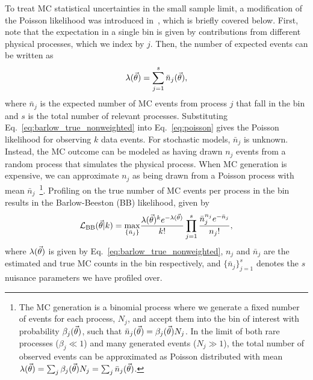 To treat MC statistical uncertainties in the small sample limit, a modification of the Poisson likelihood was introduced in~\cite{Barlow:1993dm}, which is briefly covered below.
First, note that the expectation in a single bin is given by contributions from different physical processes, which we index by $j$.
Then, the number of expected events can be written as
\begin{equation}
\lambda(\vec{\theta}) = \sum_{j=1}^s \bar n_{j}(\vec{\theta}),
\label{eq:barlow_true_nonweighted}
\end{equation}
where $\bar n_{j}$ is the expected number of MC events from process $j$ that fall in the bin and $s$ is the total number of relevant processes.
Substituting Eq.~\eqref{eq:barlow_true_nonweighted} into Eq.~\eqref{eq:poisson} gives the Poisson likelihood for observing $k$ data events.
For stochastic models, $\bar n_j$ is unknown.
Instead, the MC outcome can be modeled as having drawn $n_j$ events from a random process that simulates the physical process.
When MC generation is expensive, we can approximate $n_j$ as being drawn from a Poisson process with mean $\bar{n}_j$~\footnote{The MC generation is a binomial process where we generate a fixed number of events for each process, $N_j$, and accept them into the bin of interest with probability $\beta_{j}(\vec{\theta})$, such that $\bar n_{j}(\vec{\theta})=\beta_{j}(\vec{\theta}) N_j$.
In the limit of both rare processes ($\beta_{j} \ll 1$) and many generated events ($N_j \gg 1$), the total number of observed events can be approximated as Poisson distributed with mean $\lambda(\vec{\theta}) = \sum_j\beta_{j}(\vec{\theta}) N_j = \sum_j\bar n_{j}(\vec{\theta})$.}.
Profiling on the true number of MC events per process in the bin results in the Barlow-Beeston (BB) likelihood, given by~\cite{Barlow:1993dm}
\begin{equation}
\mathcal{L}_{\textmd{BB}}(\vec{\theta}|k) = \underset{\{\bar n_j\}}{\rm max}
\frac{\lambda(\vec{\theta})^{k}e^{-\lambda(\vec{\theta})}}{k!} \prod_{j=1}^s \frac{\bar n_j^{n_j}e^{-\bar n_j}}{n_j!},
\label{eq:barlow_likelihood_nonweighted}
\end{equation}
where $\lambda(\vec{\theta})$ is given by Eq.~\eqref{eq:barlow_true_nonweighted}, $n_{j}$ and $\bar{n}_{j}$ are the estimated and true MC counts in the bin respectively, and $\{\bar{n}_j\}_{j=1}^{s}$ denotes the $s$ nuisance parameters we have profiled over.

